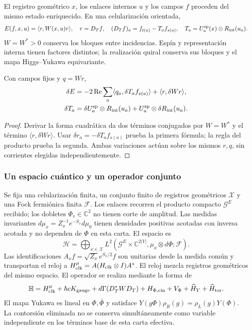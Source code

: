 El registro geométrico $x$, los enlaces internos $u$ y los campos $f$
proceden del mismo estado enriquecido. En una celularización orientada,
\begin{equation}
E(f,x,u)=\langle r,W(x,u)r\rangle,\quad r=D_Tf,\quad
(D_Tf)_a=f_{t(a)}-T_af_{s(a)},\quad
T_a=U_a^{\rm sp}(x)\otimes R_{\rm int}(u_a).
\label{hmtcuatro:gea:energia-memoria}
\end{equation}
$W=W^*>0$ conserva los bloques entre incidencias. Espín y
representación interna tienen factores distintos; la realización
quiral conserva sus bloques y el mapa Higgs--Yukawa equivariante.

\begin{proposition}
\label{hmtcuatro:gea:variacion}
Con campos fijos y $q=Wr$,
\begin{align}
\delta E&=-2\operatorname{Re}\sum_a
\langle q_a,\delta T_af_{s(a)}\rangle+\langle r,\delta Wr\rangle,
\label{hmtcuatro:gea:diferencial}\\
\delta T_a&=\delta U_a^{\rm sp}\otimes R_{\rm int}(u_a)
+U_a^{\rm sp}\otimes\delta R_{\rm int}(u_a).\nonumber
\end{align}
\end{proposition}
\begin{proof}
Derivar la forma cuadrática da dos términos conjugados por
$W=W^*$ y el término $\langle r,\delta Wr\rangle$.
Usar $\delta r_a=-\delta T_af_{s(a)}$ prueba la primera fórmula;
la regla del producto prueba la segunda.
Ambas variaciones actúan sobre los mismos $r,q$, sin corrientes
elegidas independientemente.
\end{proof}

\subsubsection{Un espacio cuántico y un operador conjunto}
\label{hmtcuatro:gea:cuantica}

Se fija una celularización finita, un conjunto finito de registros
geométricos $\mathcal X$ y una Fock fermiónica finita $\mathcal F$.
Los enlaces recorren el producto compacto $\mathcal G^E$ recibido;
los dobletes $\Phi_v\in\mathbb C^2$ no tienen corte de amplitud.
Las medidas invariantes $d\mu_x=Z_x^{-1}e^{-S_x}d\mu_0$ tienen
densidades positivas acotadas con inversa acotada y no dependen de
$\Phi$ en esta carta. El espacio es
\[
\mathscr H=\bigoplus_{x\in\mathcal X}
L^2(\mathcal G^E\times\mathbb C^{2|V|},
\mu_x\otimes d\Phi;\mathcal F).
\]
Las identificaciones $A_xf=\sqrt{Z_x}e^{S_x/2}f$ son unitarias
desde la medida común y transportan el reloj a
$H_{\rm clk}^{\mu}=A(H_{\rm clk}\otimes I)A^*$.
El reloj mezcla registros geométricos del mismo espacio.
El operador se realiza mediante la forma de
\begin{equation}
\mathbb H=H_{\rm clk}^{\mu}+\hbar cK_{\rm gauge}
+d\Gamma(D_T^*WD_T)+H_{\Phi,\rm cin}+V_\Phi
+\widehat H_Y+\widehat H_{\rm tor}.
\label{hmtcuatro:gea:total}
\end{equation}
El mapa Yukawa es lineal en $\Phi,\bar\Phi$ y satisface
$Y(g\Phi)\rho_R(g)=\rho_L(g)Y(\Phi)$.
La contorsión eliminada no se conserva simultáneamente como variable
independiente en los términos base de esta carta efectiva.

